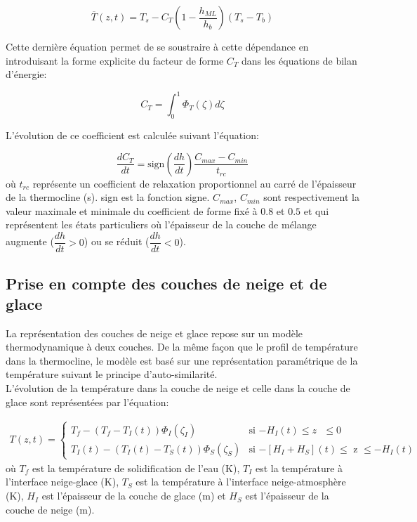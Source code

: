 \begin{equation}
\overline{T}(z,t) = T_{s} - C_{T}(1-\frac{h_{ML}}{h_{b}})(T_{s}-T_{b})
\end{equation} 

\noindent Cette dernière équation permet de se soustraire à cette dépendance en introduisant la forme explicite du facteur de forme $C_{T}$ dans les équations de bilan d'énergie:

\begin{equation}
C_{T} = \int_{0}^{1} \Phi_{T}(\zeta) d\zeta
\end{equation}

\noindent L'évolution de ce coefficient est calculée suivant l'équation:

\begin{equation}
\frac{dC_{T}}{dt}= \text{sign}(\frac{dh}{dt})\frac{C_{max}-C_{min}}{t_{rc}}
\end{equation}
où $t_{rc}$ représente un coefficient de relaxation proportionnel au carré de l'épaisseur de la thermocline (s). sign est la fonction signe. $C_{max}$, $C_{min}$ sont respectivement la valeur maximale et minimale du coefficient de forme fixé à $0.8$ et $0.5$ et qui représentent les états particuliers où l'épaisseur de la couche de mélange augmente ($\dfrac{dh}{dt}>0$) ou se réduit ($\dfrac{dh}{dt}<0$).\\

\subsection{{\selectfont Prise en compte des couches de neige et de glace}}

La représentation des couches de neige et glace repose sur un modèle thermodynamique à deux couches. De la même façon que le profil de température dans la thermocline, le modèle est basé sur une représentation paramétrique de la température suivant le principe d'auto-similarité.\\

\noindent L'évolution de la température dans la couche de neige et celle dans la couche de glace sont représentées par l'équation:

\begin{align}\label{temp_neige_lake}
T(z,t)=
\begin{cases}
 T_{f} - (T_{f} - T_{I}(t))\Phi_{I}(\zeta_{I}) & \text{si $-H_{I}(t) \leq z$ $\leq 0$}\\
 T_{I}(t)-(T_{I}(t)-T_{S}(t))\Phi_{S}(\zeta_{S})& \text{si $-[H_{I}+H_{S}](t) \leq$ z $\leq -H_{I}(t)$}
\end{cases}
\end{align}
où $T_{f}$ est la température de solidification de l'eau (K), $T_{I}$ est la température à l'interface neige-glace (K), $T_{S}$ est la température à l'interface neige-atmosphère (K), $H_{I}$ est l'épaisseur de la couche de glace (m) et $H_{S}$ est l'épaisseur de la couche de neige (m).\\

